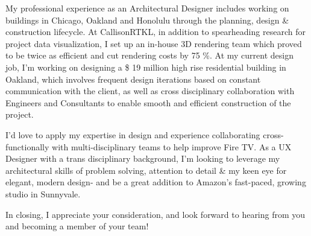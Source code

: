 \documentclass[11pt, a4paper]{awesome-cv}
\begin{document}
\begin{cvletter}
My professional experience as an Architectural Designer includes working on buildings in Chicago, Oakland and Honolulu through the planning, design \& construction lifecycle. At CallisonRTKL, in addition to spearheading research for project data visualization, I set up an in-house 3D rendering team which proved to be twice as efficient and cut rendering costs by 75 \%. At my current design job, I'm working on designing a \$ 19 million high rise residential building in Oakland, which involves frequent design iterations based on constant communication with the client, as well as cross disciplinary collaboration with Engineers and Consultants to enable smooth and efficient construction of the project.
 
I'd love to apply my expertise in design and experience collaborating cross-functionally with multi-disciplinary teams to help improve Fire TV. As a UX Designer with a trans disciplinary background, I'm looking to leverage my architectural skills of problem solving, attention to detail \& my keen eye for elegant, modern design- and be a great addition to Amazon's fast-paced, growing studio in Sunnyvale.

In closing, I appreciate your consideration, and look forward to hearing from you and becoming a member of your team!



\end{cvletter}


\makeletterclosing
\end{document}
